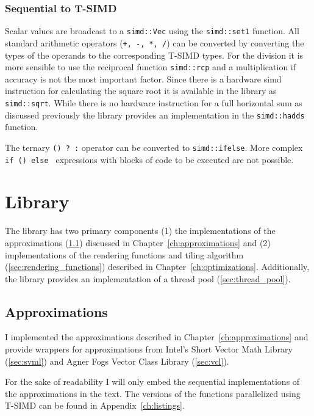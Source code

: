 \documentclass[a4paper, 11pt]{memoir}
\begin{document}
    \subsubsection{Sequential to T-SIMD}
    \label{sec:seq_to_tsimd}

    Scalar values are broadcast to a \texttt{simd::Vec} using the \texttt{simd::set1} function. All
    standard arithmetic operators (\texttt{+, -, *, /}) can be converted by converting the types of the
    operands to the corresponding T-SIMD types. For the division it is more sensible to use the reciprocal function
    \texttt{simd::rcp} and a multiplication if accuracy is not the most important factor. Since there is a
    hardware \gls{simd} instruction for calculating the square root it is available in the library as
    \texttt{simd::sqrt}. While there is no hardware instruction for a full horizontal sum as discussed previously
    the library provides an implementation in the \texttt{simd::hadds} function.

    The ternary \texttt{() ? :} operator can be converted to \texttt{simd::ifelse}. More complex
    \texttt{if () {} else {}} expressions with blocks of code
    to be executed are not possible.

    \section{Library}
    \label{sec:library}
    The library has two primary components (1) the implementations of the approximations (\ref{sec:impl_approx})
    discussed in Chapter~\ref{ch:approximations} and (2) implementations of the rendering functions and tiling
    algorithm (\ref{sec:rendering_functions}) described in Chapter~\ref{ch:optimizations}. Additionally, the library
    provides an implementation of a thread pool (\ref{sec:thread_pool}).

    \subsection{Approximations}
    \label{sec:impl_approx}
    I implemented the approximations described in Chapter~\ref{ch:approximations} and provide wrappers for
    approximations from Intel's Short Vector Math Library (\ref{sec:svml}) and Agner Fogs Vector Class Library
    (\ref{sec:vcl}).

    For the sake of readability I will only embed the sequential implementations of the approximations in the text. The
    versions of the functions parallelized using T-SIMD can be found in Appendix~\ref{ch:listings}.
\end{document}
